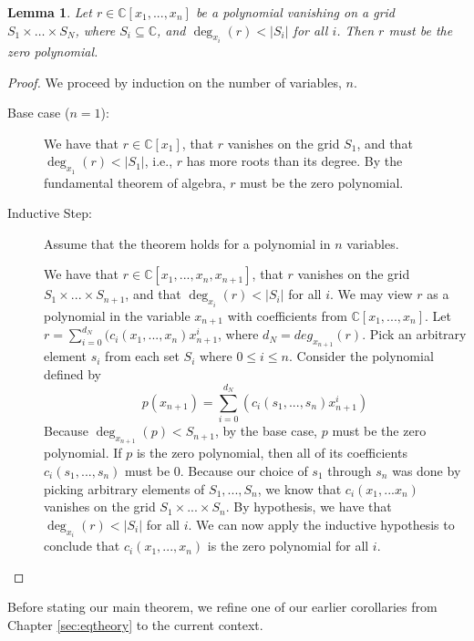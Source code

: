\documentclass{msthesis}
\newtheorem{lemma}[theorem]{Lemma}
\theoremstyle{definition}
\newcommand{\mbC}{\mathbb{C}}
\begin{document}
\begin{lemma}\label{lemma:nullstellensatzlemma}
Let $r \in \mathbb{C}[x_1, ..., x_n]$ be a polynomial vanishing on a grid $S_1 \times \dots \times S_N$, where $S_i \subseteq \mbC$, and $\deg_{x_i}(r) < |S_i|$ for all $i$. Then $r$ must be the zero polynomial.
\end{lemma}
\begin{proof}
    We proceed by induction on the number of variables, $n$.
    \begin{description}
        \item[Base case ($n = 1$):]  We have that $r \in \mathbb{C}[x_1]$, that $r$ vanishes on the grid $S_1$, and that $\deg_{x_1}(r) < |S_1|$, i.e., $r$ has more roots than its degree.  By the fundamental theorem of algebra, $r$ must be the zero polynomial.
        \item[Inductive Step:] Assume that the theorem holds for a polynomial in $n$ variables.

        We have that $r \in \mathbb{C}[x_1, ..., x_n, x_{n+1}]$, that $r$ vanishes on the grid $S_1 \times ... \times S_{n+1}$, and that $\deg_{x_i}(r) < |S_i|$ for all $i$.  We may view $r$ as a polynomial in the variable $x_{n+1}$ with coefficients from $\mathbb{C}[x_1, ..., x_n]$.
        Let $r = \sum_{i=0}^{d_N}(c_i(x_1, ..., x_n)x_{n+1}^i$, where $d_N = deg_{x_{n+1}}(r)$.  Pick an arbitrary element $s_i$ from each set $S_i$ where $0 \le i \le n$. Consider the polynomial defined by 
        \[ p(x_{n+1}) = \sum_{i=0}^{d_N}(c_i(s_1, ..., s_n)x_{n+1}^i) \]
        Because $\deg_{x_{n+1}}(p) < S_{n+1}$, by the base case, $p$ must be the zero polynomial.  If $p$ is the zero polynomial, then all of its coefficients $c_i(s_1, ..., s_n)$ must be 0.  Because our choice of $s_1$ through $s_n$ was done by picking arbitrary elements of $S_1, ..., S_n$, we know that $c_i(x_1, ... x_n)$ vanishes on the grid $S_1 \times ... \times S_n$.  By hypothesis, we have that $\deg_{x_i}(r) < |S_i|$ for all $i$.  We can now apply the inductive hypothesis to conclude that $c_i(x_1, ..., x_n)$ is the zero polynomial for all $i$. \qedhere
    \end{description}
\end{proof}

Before stating our main theorem, we refine one of our earlier corollaries from Chapter \ref{sec:eqtheory} to the current context.
\end{document}
